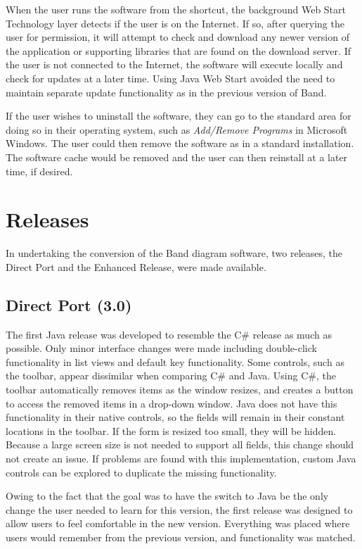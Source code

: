 \documentclass[project]{bsu-ms}
\begin{document}
When the user runs the software from the shortcut, the background Web Start Technology layer detects if the user is on the Internet. If so, after querying the user for permission, it will attempt to check and download any newer version of the application or supporting libraries that are found on the download server. If the user is not connected to the Internet, the software will execute locally and check for updates at a later time. Using Java Web Start avoided the need to maintain separate update functionality as in the previous version of Band. 

If the user wishes to uninstall the software, they can go to the standard area for doing so in their operating system, such as \emph{Add/Remove Programs} in Microsoft Windows. The user could then remove the software as in a standard installation. The software cache would be removed and the user can then reinstall at a later time, if desired.



\section{Releases}\label{sec:releases}

In undertaking the conversion of the Band diagram software, two releases, the Direct Port and the Enhanced Release, were made available.

\subsection{Direct Port (3.0)}\label{sub:directPort}
The first Java release was developed to resemble the C\# release as much as possible. Only minor interface changes were made including double-click functionality in list views and default key functionality. Some controls, such as the toolbar, appear dissimilar when comparing C\# and Java. Using C\#, the toolbar automatically removes items as the window resizes, and creates a button to access the removed items in a drop-down window. Java does not have this functionality in their native controls, so the fields will remain in their constant locations in the toolbar. If the form is resized too small, they will be hidden. Because a large screen size is not needed to support all fields, this change should not create an issue. If problems are found with this implementation, custom Java controls can be explored to duplicate the missing functionality.

Owing to the fact that the goal was to have the switch to Java be the only change the user needed to learn for this version, the first release was designed to allow users to feel comfortable in the new version. Everything was placed where users would remember from the previous version, and functionality was matched.
\end{document}
